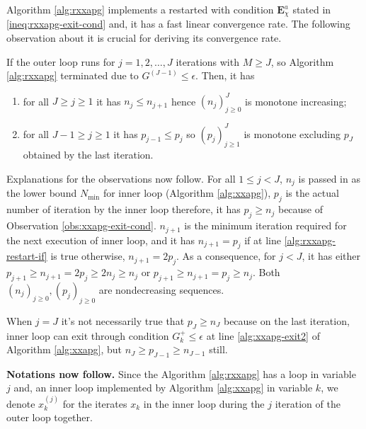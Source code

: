 \documentclass[12pt]{report}
\begin{document}
        Algorithm \ref{alg:rxxapg} implements a restarted \XXAPG{} with condition $\textbf{E}_{\chi}^a$ stated in \eqref{ineq:rxxapg-exit-cond} and, it has a fast linear convergence rate. 
        The following observation about it is crucial for deriving its convergence rate. 
        \begin{observation}\label{obs:rxxapg}
            If the outer loop runs for $j = 1, 2, \ldots, J$ iterations with $M \ge J$, so Algorithm \ref{alg:rxxapg} terminated due to $G^{(J - 1)} \le \epsilon$. 
            Then, it has 
            \begin{enumerate}
                \item for all $J\ge j\ge 1$ it has $n_{j}\le n_{j + 1}$ hence $(n_j)_{j \ge 0}^J$ is monotone increasing; 
                \item for all $J -1 \ge j \ge 1 $ it has $p_{j-1}\le p_{j}$ so $(p_j)_{j \ge 1}^{J}$ is monotone excluding $p_J$ obtained by the last iteration. 
            \end{enumerate}
        \end{observation}
        \par
        Explanations for the observations now follow. 
        For all $1 \le j < J$, $n_j$ is passed in as the lower bound $N_{\min}$ for \XXAPG{} inner loop (Algorithm \ref{alg:xxapg}), $p_j$ is the actual number of iteration by the inner loop therefore, it has $p_j \ge n_{j}$ because of Observation \ref{obs:xxapg-exit-cond}. 
        $n_{j + 1}$ is the minimum iteration required for the next execution of \XXAPG{} inner loop, and it has $n_{j + 1} = p_{j}$ if at line \ref{alg:rxxapg-restart-if} is true otherwise, $n_{j + 1} = 2p_{j}$. 
        As a consequence, for $j < J$, it has either $p_{j + 1} \ge n_{j + 1} = 2p_j \ge 2n_{j} \ge n_j$ or $p_{j + 1} \ge n_{j + 1} = p_j \ge n_j$. 
        Both $(n_j)_{j\ge0}, (p_j)_{j\ge 0}$ are nondecreasing sequences. 
        \par
        When $j = J$ it's not necessarily true that $p_J \ge n_J$ because on the last iteration, inner loop can exit through condition $G_k^+ \le \epsilon$ at line \ref{alg:xxapg-exit2} of Algorithm \ref{alg:xxapg}, but $n_J \ge p_{J - 1} \ge n_{J - 1}$ still. 
        \par
        \textbf{Notations now follow.}
        Since the Algorithm \ref{alg:rxxapg} has a loop in variable $j$ and, an inner loop implemented by Algorithm \ref{alg:xxapg} in variable $k$, we denote $x_{k}^{(j)}$ for the iterates $x_k$ in the inner loop during the $j$ iteration of the outer loop together. 
\end{document}
